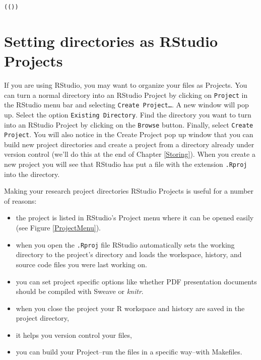\documentclass[krantz1]{krantz}
\begin{document}
\begin{knitrout}
\color{fgcolor}\begin{kframe}
\begin{alltt}
(())
\end{alltt}
\end{kframe}
\end{knitrout}



\section{Setting directories as RStudio Projects}

If you are using RStudio, you may want to organize your files as Projects.\label{CreateRStudioProject} You can turn a normal directory into an RStudio Project by clicking on \texttt{Project} in the RStudio menu bar and selecting \texttt{Create Project\ldots}. A new window will pop up. Select the option \texttt{Existing Directory}. Find the directory you want to turn into an RStudio Project by clicking on the \texttt{Browse} button. Finally, select \texttt{Create Project}. You will also notice in the Create Project pop up window that you can build new project directories and create a project from a directory already under version control (we'll do this at the end of Chapter \ref{Storing}). When you create a new project you will see that RStudio has put a file with the extension \texttt{.Rproj} into the directory.

Making your research project directories RStudio Projects is useful for a number of reasons:

\begin{itemize}
    \item the project is listed in RStudio's Project menu where it can be opened easily (see Figure \ref{ProjectMenu}).
    \item when you open the \texttt{.Rproj} file RStudio automatically sets the working directory to the project's directory and loads the workspace, history, and source code files you were last working on.
    \item you can set project specific options like whether PDF presentation documents should be compiled with Sweave or {\emph{knitr}}.
    \item when you close the project your R workspace and history are saved in the project directory,
    \item it helps you version control your files,
    \item you can build your Project--run the files in a specific way--with Makefiles.
\end{itemize}
\end{document}
